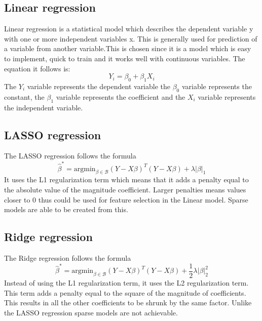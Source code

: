 \documentclass[11pt]{article}
\begin{document}
\subsection{Linear regression}
Linear regression is a statistical model which describes the dependent variable y with one or more independent variables x. This is generally used for prediction of a variable from another variable.This is chosen since it is a model which is easy to implement, quick to train and it works well with continuous variables. The equation it follows is: 
\begin{equation}
Y_i = \beta_0 + \beta_1 X_i
\end{equation}
The \begin{math} Y_i \end{math} variable represents the dependent variable the \begin{math} \beta_0 \end{math} variable represents the constant, the \begin{math} \beta_1 \end{math} variable represents the coefficient and the \begin{math} X_i \end{math} variable represents the independent variable.

\subsection{LASSO regression}
The LASSO regression follows the formula 
\begin{equation}
\label{eq:LASSO OLS}
\hat\beta^* = \text{argmin}_{\beta \in \mathcal{B}}(Y-X\beta)^T(Y-X\beta) + \lambda|\beta|_1
\end{equation}
It uses the L1 regularization term which means that it adds a penalty equal to the absolute value of the magnitude coefficient. Larger penalties means values closer to 0 thus could be used for feature selection in the Linear model. Sparse models are able to be created from this.

\subsection{Ridge regression}
The Ridge regression follows the formula
\begin{equation}
\label{eq:Ridge}
\hat\beta^* = \text{argmin}_{\beta \in \mathcal{B}}(Y-X\beta)^T(Y-X\beta) + \frac{1}{2}\lambda|\beta|_2^2
\end{equation}
Instead of using the L1 regularization term, it uses the L2 regularization term. This term adds a penalty equal to the square of the magnitude of coefficients. This results in all the other coefficients to be shrunk by the same factor. Unlike the LASSO regression sparse models are not achievable.
\end{document}
